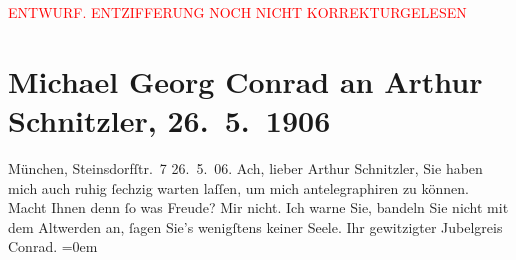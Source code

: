 
\begin{center}
            \textcolor{red}{ENTWURF. ENTZIFFERUNG NOCH NICHT KORREKTURGELESEN}
                      \end{center}
            
               \section[Michael Georg Conrad an Arthur Schnitzler, 26. 5. 1906]{ Michael Georg Conrad an Arthur Schnitzler, 26. 5. 1906}\nopagebreak{}\rehead{ }\begin{ledgroupsized}[t]{13cm}\normalsize\beginnumbering{} \toendnotes[C]{\smallbreak\pagebreak[2]} 
\pstart
           \noindent{}{\pb}München, Steinsdorfſtr. 7\pend
           \pstart
           \raggedleft{}26. 5. 06.\pend
           \pstart
           Ach, lieber Arthur Schnitzler, Sie haben mich auch ruhig ſechzig
                    warten laſſen, um mich antelegraphiren zu können. Macht Ihnen denn ſo was
                    Freude? Mir nicht. Ich warne Sie, bandeln Sie nicht mit dem Altwerden an, ſagen
                    Sie’s wenigſtens keiner Seele.\pend
           \pstart
           Ihr gewitzigter Jubelgreis{\\[\baselineskip]}\spacefill\mbox{Conrad.}\pend
           \leftskip=0em{}\endnumbering{}\end{ledgroupsized}  \newcommand{\dateiname}{L01599}\newcommand{\titel}{Michael Georg Conrad an Arthur Schnitzler, 26. 5. 1906}\newcommand{\editorInnen}{Martin Anton Müller und Gerd-Hermann Susen}
      